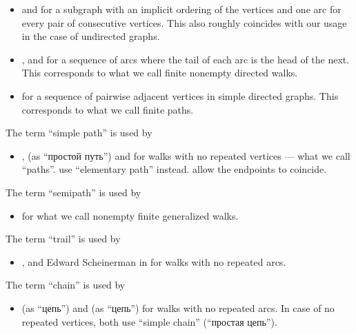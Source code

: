 \begin{remark}
\begin{thmenum}
\begin{itemize}
      \item {} and  for a subgraph with an implicit ordering of the vertices and one arc for every pair of consecutive vertices. This also roughly coincides with our usage in the case of undirected graphs.

      \item {},  and  for a sequence of arcs where the tail of each arc is the head of the next. This corresponds to what we call finite nonempty directed walks.

      \item {} for a sequence of pairwise adjacent vertices in simple directed graphs. This corresponds to what we call finite paths.
    \end{itemize}

     The term \enquote{simple path} is used by
    \begin{itemize}
      \item {},  (as \enquote{простой путь}) and  for walks with no repeated vertices --- what we call \enquote{paths}.  use \enquote{elementary path} instead.  allow the endpoints to coincide.
    \end{itemize}

     The term \enquote{semipath} is used by
    \begin{itemize}
      \item {} for what we call nonempty finite generalized walks.
    \end{itemize}

     The term \enquote{trail} is used by
    \begin{itemize}
      \item {},  and Edward Scheinerman in \cite[572]{Rosen1999} for walks with no repeated arcs.
    \end{itemize}

     The term \enquote{chain} is used by
    \begin{itemize}
      \item {} (as \enquote{цепь}) and  (as \enquote{цепь}) for walks with no repeated arcs. In case of no repeated vertices, both use \enquote{simple chain} (\enquote{простая цепь}).


\end{itemize}
\end{thmenum}
\end{remark}
